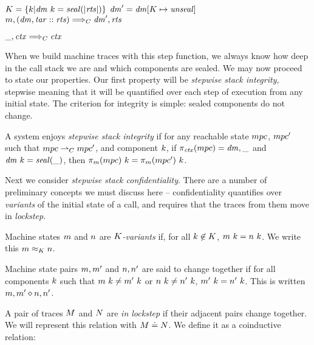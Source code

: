 \documentclass[acmsmall,review,anonymous]{acmart}\settopmatter{printfolios=true,printccs=false,printacmref=false}
\begin{document}
              {\(K = \{k | \mathit{dm} ~ k = \mathit{seal(|\mathit{rts}|)}\}\)}
              {\(\mathit{dm}' = \mathit{dm}[K \mapsto \mathit{unseal}]\)}
              {\(m,(\mathit{dm},\mathit{tar}::\mathit{rts}) \Longrightarrow_C \mathit{dm}',\mathit{rts}\)}

\judgment[Default]
         {}
         {\(\_,\mathit{ctx} \Longrightarrow_C \mathit{ctx}\)}

When we build machine traces with this step function, we always know how deep in the
call stack we are and which components are sealed. We may now proceed to state our properties.
Our first property will be {\em stepwise stack integrity}, stepwise meaning that it will be
quantified over each step of execution from any initial state. The criterion for integrity
is simple: sealed components do not change.

 A system enjoys {\em stepwise stack integrity} if for any reachable state
\(mpc\), \(mpc'\) such that \(mpc \overset{}{\rightharpoonup}_C mpc'\),
and component \(k\), if \(\pi_{\mathit{ctx}}(mpc) = \mathit{dm},\_\) and
\(\mathit{dm} ~ k = \mathit{seal(\_)}\), then \(\pi_m(mpc) ~ k =
\pi_m(mpc') ~ k\).

Next we consider {\em stepwise stack confidentiality}. There are a number of preliminary
concepts we must discuss here -- confidentiality quantifies over {\em variants} of the
initial state of a call, and requires that the traces from them move in {\em lockstep}.

 Machine states \(m\) and \(n\) are {\em \(K\)-variants} if, for
all \(k \not \in K\), \(m ~ k = n ~ k\). We write
this \(m \approx_K n\).

 Machine state pairs \(m,m'\) and \(n,n'\) are said to change
together if for all components \(k\) such that
\(m ~ k \not = m' ~ k\) or
\(n ~ k \not = n' ~ k\),
\(m' ~ k = n' ~ k\).
This is written \(m,m' \diamond n,n'\).

 A pair of traces \(M\) and \(N\) are {\em in lockstep}
if their adjacent pairs change together. We will represent this relation with
\(M \doteq N\). 
We define it as a coinductive relation:
\end{document}
